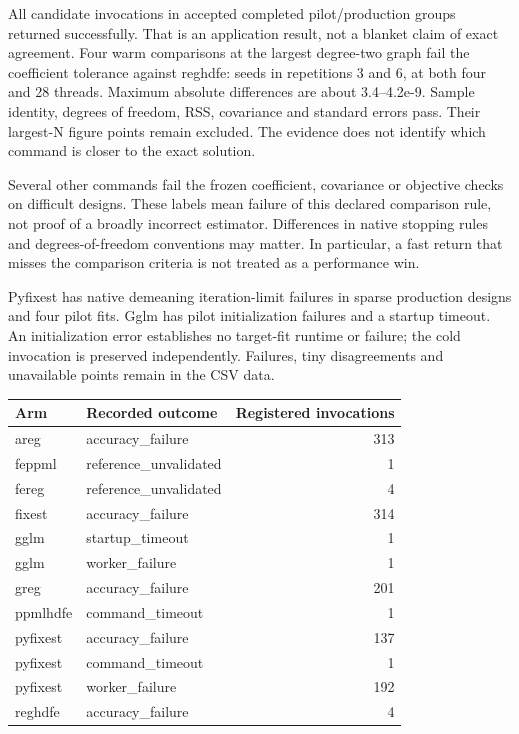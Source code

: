 \documentclass[11pt]{article}
\begin{document}
All candidate invocations in accepted completed pilot/production groups returned successfully. That is an application result, not a blanket claim of exact agreement. Four warm comparisons at the largest degree-two graph fail the coefficient tolerance against reghdfe: seeds in repetitions 3 and 6, at both four and 28 threads. Maximum absolute differences are about 3.4--4.2e-9. Sample identity, degrees of freedom, RSS, covariance and standard errors pass. Their largest-N figure points remain excluded. The evidence does not identify which command is closer to the exact solution.

Several other commands fail the frozen coefficient, covariance or objective checks on difficult designs. These labels mean failure of this declared comparison rule, not proof of a broadly incorrect estimator. Differences in native stopping rules and degrees-of-freedom conventions may matter. In particular, a fast return that misses the comparison criteria is not treated as a performance win.

Pyfixest has native demeaning iteration-limit failures in sparse production designs and four pilot fits. Gglm has pilot initialization failures and a startup timeout. An initialization error establishes no target-fit runtime or failure; the cold invocation is preserved independently. Failures, tiny disagreements and unavailable points remain in the CSV data.

\small\begin{longtable}{llr}
\toprule
Arm & Recorded outcome & Registered invocations\\\midrule\endhead
areg & accuracy\_failure & 313\\
feppml & reference\_unvalidated & 1\\
fereg & reference\_unvalidated & 4\\
fixest & accuracy\_failure & 314\\
gglm & startup\_timeout & 1\\
gglm & worker\_failure & 1\\
greg & accuracy\_failure & 201\\
ppmlhdfe & command\_timeout & 1\\
pyfixest & accuracy\_failure & 137\\
pyfixest & command\_timeout & 1\\
pyfixest & worker\_failure & 192\\
reghdfe & accuracy\_failure & 4\\
\bottomrule\end{longtable}\normalsize
\end{document}

